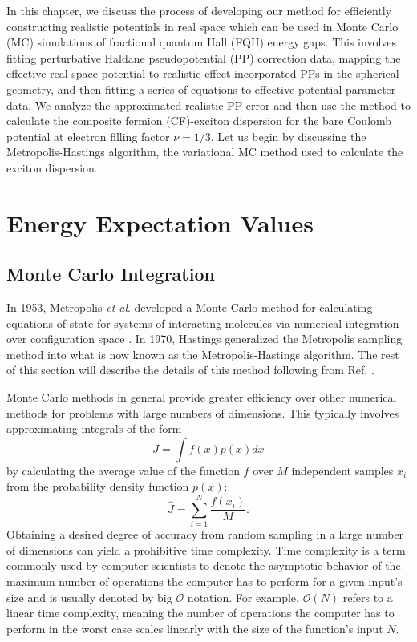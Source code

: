 \doublespacing

In this chapter, we discuss the process of developing our method for efficiently constructing realistic potentials in real space which can be used in Monte Carlo (MC) simulations of fractional quantum Hall (FQH) energy gaps. This involves fitting perturbative Haldane pseudopotential (PP) correction data, mapping the effective real space potential to realistic effect-incorporated PPs in the spherical geometry, and then fitting a series of equations to effective potential parameter data. We analyze the approximated realistic PP error and then use the method to calculate the composite fermion (CF)-exciton dispersion for the bare Coulomb potential at electron filling factor $\nu=1/3$. Let us begin by discussing the Metropolis-Hastings algorithm, the variational MC method used to calculate the exciton dispersion.

\section{Energy Expectation Values} \label{sec:enExpVal}

    \subsection{Monte Carlo Integration} \label{ssec:montCarlInt}
    In 1953, Metropolis \textit{et al}. developed a Monte Carlo method for calculating equations of state for systems of interacting molecules via numerical integration over configuration space \cite{metropolis}. In 1970, Hastings generalized the Metropolis sampling method into what is now known as the Metropolis-Hastings algorithm. The rest of this section will describe the details of this method following from Ref. \cite{hastings}.
    
    Monte Carlo methods in general provide greater efficiency over other numerical methods for problems with large numbers of dimensions. This typically involves approximating integrals of the form 
    \begin{equation}\label{eqn:mont_carl_int}
    J=\int f(x)p(x)dx
    \end{equation}
    by calculating the average value of the function $f$ over $M$ independent samples $x_i$ from the probability density function $p(x)$:
    \begin{equation}\label{eqn:mont_carl_sum}
    \hat{J}=\sum_{i=1}^N \frac{f(x_i)}{M}.
    \end{equation}
    Obtaining a desired degree of accuracy from random sampling in a large number of dimensions can yield a prohibitive time complexity. Time complexity is a term commonly used by computer scientists to denote the asymptotic behavior of the maximum number of operations the computer has to perform for a given input's size and is usually denoted by big $\mathcal{O}$ notation. For example, $\mathcal{O}(N)$ refers to a linear time complexity, meaning the number of operations the computer has to perform in the worst case scales linearly with the size of the function's input $N$.
    
